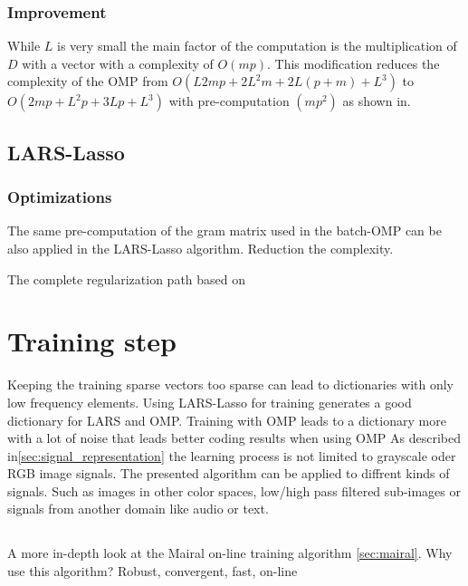 \subsubsection*{Improvement}
While $L$ is very small the main factor of the computation is
the multiplication of $D$ with a vector with a complexity of $O(mp)$. 
This modification reduces the complexity of the OMP from $O\left(L2mp + 2L^2m + 2L(p+m) + L^3\right)$ to $O\left(2mp + L^2p + 3Lp + L^3\right)$ 
with pre-computation $\left(mp^2\right)$ as shown in\cite{Rubinstein2008}. 

\subsection{LARS-Lasso}
\subsubsection*{Optimizations}
The same pre-computation of the gram matrix used in the batch-OMP can be
also applied in the LARS-Lasso algorithm. Reduction the complexity. %

The complete regularization path based on\cite{Efron2004}


\section{Training step}
Keeping the training sparse vectors too sparse can lead to dictionaries with
only low frequency elements. Using LARS-Lasso for training generates a good
dictionary for LARS and OMP. Training with OMP leads to a dictionary more with a
lot of noise that leads better coding results when using OMP 
As described in\ref{sec:signal_representation} the learning process is not
limited to grayscale oder RGB image signals. The presented algorithm can be
applied to diffrent kinds of signals. Such as images in other color
spaces, low/high pass filtered sub-images or signals from another domain like
audio or text. 


\subsection{\trainDL}
A more in-depth look at the Mairal on-line training algorithm \ref{sec:mairal}. 
Why use this algorithm? Robust, convergent, fast, on-line

